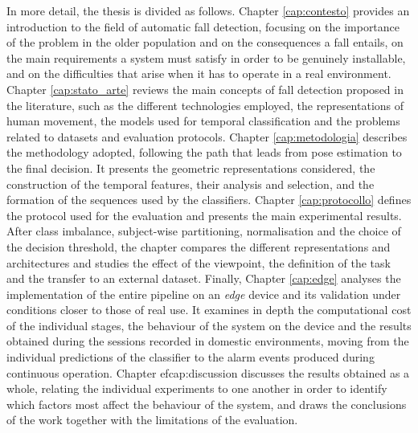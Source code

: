In more detail, the thesis is divided as follows. Chapter \ref{cap:contesto}
provides an introduction to the field of automatic fall detection, focusing on
the importance of the problem in the older population and on the consequences
a fall entails, on the main requirements a system must satisfy in order to be
genuinely installable, and on the difficulties that arise when it has to
operate in a real environment.
Chapter \ref{cap:stato_arte} reviews the main concepts of fall detection
proposed in the literature, such as the different technologies employed, the
representations of human movement, the models used for temporal
classification and the problems related to datasets and evaluation protocols.
Chapter \ref{cap:metodologia} describes the methodology adopted, following the
path that leads from pose estimation to the final decision. It presents the
geometric representations considered, the construction of the temporal
features, their analysis and selection, and the formation of the sequences
used by the classifiers.
Chapter \ref{cap:protocollo} defines the protocol used for the evaluation and
presents the main experimental results. After class imbalance, subject-wise
partitioning, normalisation and the choice of the decision threshold, the
chapter compares the different representations and architectures and studies
the effect of the viewpoint, the definition of the task and the transfer to an
external dataset.
Finally, Chapter \ref{cap:edge} analyses the implementation of the entire
pipeline on an \emph{edge} device and its validation under conditions closer
to those of real use. It examines in depth the computational cost of the
individual stages, the behaviour of the system on the device and the results
obtained during the sessions recorded in domestic environments, moving from
the individual predictions of the classifier to the alarm events produced
during continuous operation.
Chapter 
ef{cap:discussion} discusses the results obtained as a whole, relating the individual experiments to one another in order to identify which factors most affect the behaviour of the system, and draws the conclusions of the work together with the limitations of the evaluation.
